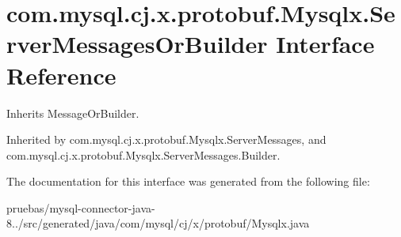 \hypertarget{interfacecom_1_1mysql_1_1cj_1_1x_1_1protobuf_1_1_mysqlx_1_1_server_messages_or_builder}{}\section{com.\+mysql.\+cj.\+x.\+protobuf.\+Mysqlx.\+Server\+Messages\+Or\+Builder Interface Reference}
\label{interfacecom_1_1mysql_1_1cj_1_1x_1_1protobuf_1_1_mysqlx_1_1_server_messages_or_builder}


Inherits Message\+Or\+Builder.



Inherited by com.\+mysql.\+cj.\+x.\+protobuf.\+Mysqlx.\+Server\+Messages, and com.\+mysql.\+cj.\+x.\+protobuf.\+Mysqlx.\+Server\+Messages.\+Builder.



The documentation for this interface was generated from the following file\+:\begin{DoxyCompactItemize}
\item 
pruebas/mysql-\/connector-\/java-\/8../src/generated/java/com/mysql/cj/x/protobuf/Mysqlx.\+java\end{DoxyCompactItemize}
